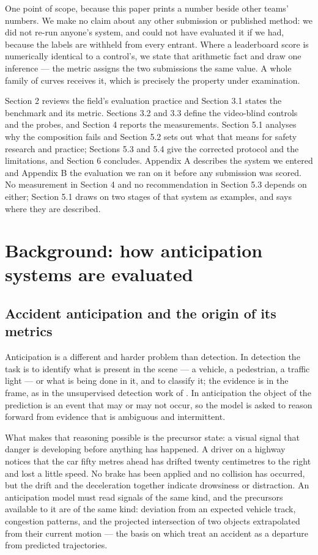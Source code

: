 One point of scope, because this paper prints a number beside other teams' numbers. We make no claim about any other submission or published method: we did not re-run anyone's system, and could not have evaluated it if we had, because the labels are withheld from every entrant. Where a leaderboard score is numerically identical to a control's, we state that arithmetic fact and draw one inference --- the metric assigns the two submissions the same value. A whole family of curves receives it, which is precisely the property under examination.

Section 2 reviews the field's evaluation practice and Section 3.1 states the benchmark and its metric. Sections 3.2 and 3.3 define the video-blind controls and the probes, and Section 4 reports the measurements. Section 5.1 analyses why the composition fails and Section 5.2 sets out what that means for safety research and practice; Sections 5.3 and 5.4 give the corrected protocol and the limitations, and Section 6 concludes. Appendix A describes the system we entered and Appendix B the evaluation we ran on it before any submission was scored. No measurement in Section 4 and no recommendation in Section 5.3 depends on either; Section 5.1 draws on two stages of that system as examples, and says where they are described.


\section{Background: how anticipation systems are evaluated}

\subsection{Accident anticipation and the origin of its metrics}
Anticipation is a different and harder problem than detection. In detection the task is to identify what is present in the scene --- a vehicle, a pedestrian, a traffic light --- or what is being done in it, and to classify it; the evidence is in the frame, as in the unsupervised detection work of \citet{liu2026sctnet}. In anticipation the object of the prediction is an event that may or may not occur, so the model is asked to reason forward from evidence that is ambiguous and intermittent.

What makes that reasoning possible is the precursor state: a visual signal that danger is developing before anything has happened. A driver on a highway notices that the car fifty metres ahead has drifted twenty centimetres to the right and lost a little speed. No brake has been applied and no collision has occurred, but the drift and the deceleration together indicate drowsiness or distraction. An anticipation model must read signals of the same kind, and the precursors available to it are of the same kind: deviation from an expected vehicle track, congestion patterns, and the projected intersection of two objects extrapolated from their current motion --- the basis on which \citet{yao2019unsupervised} treat an accident as a departure from predicted trajectories.

